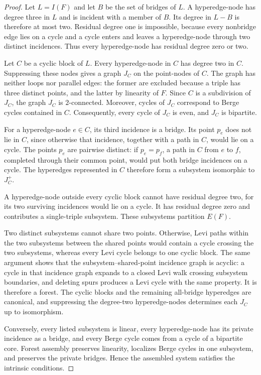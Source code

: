 \begin{proof}
Let $L=I(F)$ and let $B$ be the set of bridges of $L$. A hyperedge-node has
degree three in $L$ and is incident with a member of $B$. Its degree in $L-B$
is therefore at most two. Residual degree one is impossible, because every
nonbridge edge lies on a cycle and a cycle enters and leaves a
hyperedge-node through two distinct incidences. Thus every hyperedge-node has
residual degree zero or two.

Let $C$ be a cyclic block of $L$. Every hyperedge-node in $C$ has degree two
in $C$. Suppressing these nodes gives a graph $J_C$ on the point-nodes of
$C$. The graph has neither loops nor parallel edges: the former are excluded
because a triple has three distinct points, and the latter by linearity of
$F$. Since $C$ is a subdivision of $J_C$, the graph $J_C$ is $2$-connected.
Moreover, cycles of $J_C$ correspond to Berge cycles contained in $C$.
Consequently, every cycle of $J_C$ is even, and $J_C$ is bipartite.

For a hyperedge-node $e\in C$, its third incidence is a bridge. Its point
$p_e$ does not lie in $C$, since otherwise that incidence, together with a
path in $C$, would lie on a cycle. The points $p_e$ are pairwise distinct:
if $p_e=p_f$, a path in $C$ from $e$ to $f$, completed through their common
point, would put both bridge incidences on a cycle. The hyperedges represented
in $C$ therefore form a subsystem isomorphic to $J_C^+$.

A hyperedge-node outside every cyclic block cannot have residual degree two,
for its two surviving incidences would lie on a cycle. It has residual degree
zero and contributes a single-triple subsystem. These subsystems partition
$E(F)$.

Two distinct subsystems cannot share two points. Otherwise, Levi paths within
the two subsystems between the shared points would contain a cycle crossing
the two subsystems, whereas every Levi cycle belongs to one cyclic block. The
same argument shows that the subsystem--shared-point incidence graph is
acyclic: a cycle in that incidence graph expands to a closed Levi walk crossing
subsystem boundaries, and deleting spurs produces a Levi cycle with the same
property. It is therefore a forest. The cyclic blocks and the remaining
all-bridge hyperedges are canonical, and suppressing the degree-two
hyperedge-nodes determines each $J_C$ up to isomorphism.

Conversely, every listed subsystem is linear, every hyperedge-node has its
private incidence as a bridge, and every Berge cycle comes from a cycle of a
bipartite core. Forest assembly preserves linearity, localizes Berge cycles in
one subsystem, and preserves the private bridges. Hence the assembled system
satisfies the intrinsic conditions.
\end{proof}

